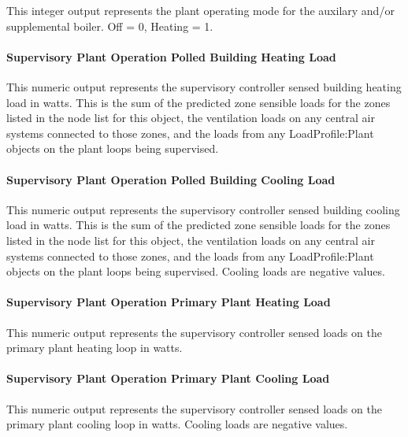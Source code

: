 This integer output represents the plant operating mode for the auxilary and/or supplemental boiler. Off = 0, Heating = 1.

\paragraph{Supervisory Plant Operation Polled Building Heating Load}\label{operation-scheme-outputs-supervisory-plant-operation-sensed-heating-load}

This numeric output represents the supervisory controller sensed building heating load in watts.  This is the sum of the predicted zone sensible loads for the zones listed in the node list for this object, the ventilation loads on any central air systems connected to those zones, and the loads from any LoadProfile:Plant objects on the plant loops being supervised. 

\paragraph{Supervisory Plant Operation Polled Building Cooling Load}\label{operation-scheme-outputs-supervisory-plant-operation-sensed-cooling-load}

This numeric output represents the supervisory controller sensed building cooling load in watts.  This is the sum of the predicted zone sensible loads for the zones listed in the node list for this object, the ventilation loads on any central air systems connected to those zones, and the loads from any LoadProfile:Plant objects on the plant loops being supervised. Cooling loads are negative values.

\paragraph{Supervisory Plant Operation Primary Plant Heating Load}\label{operation-scheme-outputs-supervisory-plant-heating-loads}

This numeric output represents the supervisory controller sensed loads on the primary plant heating loop in watts.

\paragraph{Supervisory Plant Operation Primary Plant Cooling Load}\label{operation-scheme-outputs-supervisory-plant-cooling-loads}

This numeric output represents the supervisory controller sensed loads on the primary plant cooling loop in watts.  Cooling loads are negative values.

